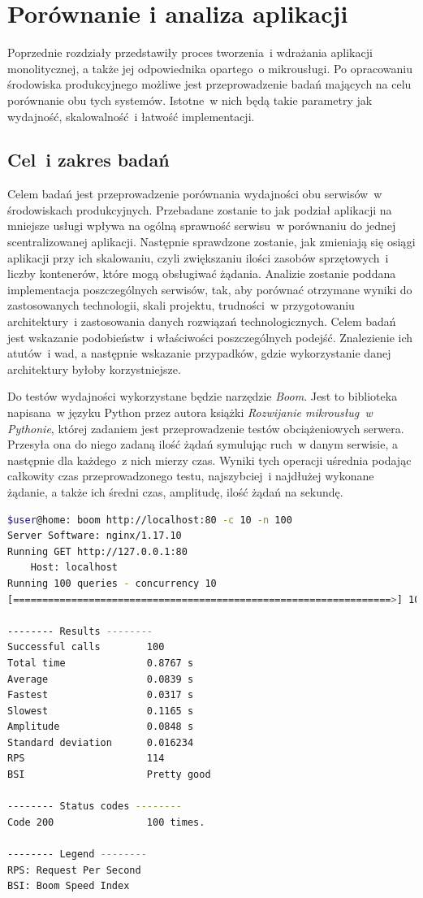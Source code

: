\chapter{Porównanie i analiza aplikacji}
\label{roz7}
Poprzednie rozdziały przedstawiły proces tworzenia~i wdrażania aplikacji monolitycznej, a także jej odpowiednika opartego~o mikrousługi. Po opracowaniu środowiska produkcyjnego możliwe jest przeprowadzenie badań mających na celu porównanie obu tych systemów. Istotne~w nich będą takie parametry jak wydajność, skalowalność~i łatwość implementacji.

\section{Cel~i zakres badań}
Celem badań jest przeprowadzenie porównania wydajności obu serwisów~w środowiskach produkcyjnych. Przebadane zostanie to jak podział aplikacji na mniejsze usługi wpływa na ogólną sprawność serwisu~w porównaniu do jednej scentralizowanej aplikacji. Następnie sprawdzone zostanie, jak zmieniają się osiągi aplikacji przy ich skalowaniu, czyli zwiększaniu ilości zasobów sprzętowych~i liczby kontenerów, które mogą obsługiwać żądania. Analizie zostanie poddana implementacja poszczególnych serwisów, tak, aby porównać otrzymane wyniki do zastosowanych technologii, skali projektu, trudności~w przygotowaniu architektury~i zastosowania danych rozwiązań technologicznych. Celem badań jest wskazanie podobieństw~i właściwości poszczególnych podejść. Znalezienie ich atutów~i wad, a następnie wskazanie przypadków, gdzie wykorzystanie danej architektury byłoby korzystniejsze.

Do testów wydajności wykorzystane będzie narzędzie \textit{Boom}. Jest to biblioteka napisana~w języku Python przez autora książki \textit{Rozwijanie mikrousług~w Pythonie}\cite{Ziade:2018}, której zadaniem jest przeprowadzenie testów obciążeniowych serwera. Przesyła ona do niego zadaną ilość żądań symulując ruch~w danym serwisie, a następnie dla każdego~z nich mierzy czas. Wyniki tych operacji uśrednia podając całkowity czas przeprowadzonego testu, najszybciej~i najdłużej wykonane żądanie, a także ich średni czas, amplitudę, ilość żądań na sekundę.
\newpage
\begin{lstlisting}[language=Bash, caption={Przykładowy test przy wykorzystaniu narzędzia \textit{Boom}.}]
$user@home: boom http://localhost:80 -c 10 -n 100
Server Software: nginx/1.17.10
Running GET http://127.0.0.1:80
	Host: localhost
Running 100 queries - concurrency 10
[=================================================================>] 100% Done

-------- Results --------
Successful calls		100
Total time        		0.8767 s
Average           		0.0839 s
Fastest           		0.0317 s
Slowest           		0.1165 s
Amplitude         		0.0848 s
Standard deviation		0.016234
RPS               		114
BSI              		Pretty good

-------- Status codes --------
Code 200          		100 times.

-------- Legend --------
RPS: Request Per Second
BSI: Boom Speed Index
\end{lstlisting}

